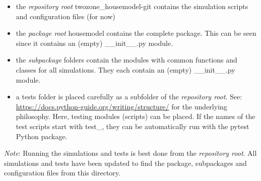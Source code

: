\begin{itemize}
	\item the \emph{repository root} \textsf{twozone\_housemodel-git} contains the simulation scripts and configuration files (for now) 
	\item the \emph{package root} \textsf{housemodel} contains the complete package. This can be seen since it contains an (empty) \textsf{\_\_init\_\_.py} module.
	\item the \emph{subpackage} folders contain the modules with common functions and classes for all simulations. They each contain an (empty) \textsf{\_\_init\_\_.py} module.
	\item a \textsf{tests} folder is placed carefully as a subfolder of the \emph{repository root}. 
	See: \url{https://docs.python-guide.org/writing/structure/} for the underlying philosophy. Here, testing modules (scripts) can be placed. If the names of the test scripts start with \textsf{test\_}, they can be automatically run with the \textsf{pytest} Python package.
\end{itemize}

\textit{Note}: Running the simulations and tests is best done from the \emph{repository root}. All simulations and tests have been updated to find the package, subpackages and configuration files from this directory.

\newpage